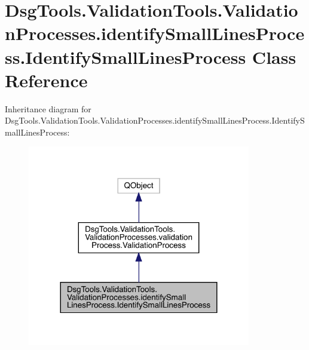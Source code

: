 \hypertarget{class_dsg_tools_1_1_validation_tools_1_1_validation_processes_1_1identify_small_lines_process_1_1_identify_small_lines_process}{}\section{Dsg\+Tools.\+Validation\+Tools.\+Validation\+Processes.\+identify\+Small\+Lines\+Process.\+Identify\+Small\+Lines\+Process Class Reference}
\label{class_dsg_tools_1_1_validation_tools_1_1_validation_processes_1_1identify_small_lines_process_1_1_identify_small_lines_process}


Inheritance diagram for Dsg\+Tools.\+Validation\+Tools.\+Validation\+Processes.\+identify\+Small\+Lines\+Process.\+Identify\+Small\+Lines\+Process\+:
\nopagebreak
\begin{figure}[H]
\begin{center}
\leavevmode
\includegraphics[width=276pt]{class_dsg_tools_1_1_validation_tools_1_1_validation_processes_1_1identify_small_lines_process_1_f064741c9f87f0308d9524eb305176e5}
\end{center}
\end{figure}


